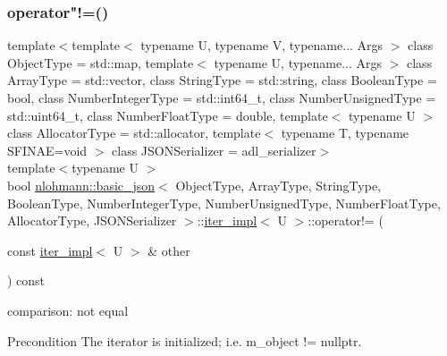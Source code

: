 \subsubsection{\texorpdfstring{operator"!=()}{operator!=()}}
{\footnotesize\ttfamily template$<$template$<$ typename U, typename V, typename... Args $>$ class Object\+Type = std\+::map, template$<$ typename U, typename... Args $>$ class Array\+Type = std\+::vector, class String\+Type  = std\+::string, class Boolean\+Type  = bool, class Number\+Integer\+Type  = std\+::int64\+\_\+t, class Number\+Unsigned\+Type  = std\+::uint64\+\_\+t, class Number\+Float\+Type  = double, template$<$ typename U $>$ class Allocator\+Type = std\+::allocator, template$<$ typename T, typename S\+F\+I\+N\+A\+E=void $>$ class J\+S\+O\+N\+Serializer = adl\+\_\+serializer$>$ \\
template$<$typename U $>$ \\
bool \hyperlink{classnlohmann_1_1basic__json}{nlohmann\+::basic\+\_\+json}$<$ Object\+Type, Array\+Type, String\+Type, Boolean\+Type, Number\+Integer\+Type, Number\+Unsigned\+Type, Number\+Float\+Type, Allocator\+Type, J\+S\+O\+N\+Serializer $>$\+::\hyperlink{classnlohmann_1_1basic__json_1_1iter__impl}{iter\+\_\+impl}$<$ U $>$\+::operator!= (\begin{DoxyParamCaption}\item[{const \hyperlink{classnlohmann_1_1basic__json_1_1iter__impl}{iter\+\_\+impl}$<$ U $>$ \&}]{other }\end{DoxyParamCaption}) const\hspace{0.3cm}{\ttfamily [inline]}}



comparison\+: not equal 

\begin{DoxyPrecond}{Precondition}
The iterator is initialized; i.\+e. {\ttfamily m\+\_\+object != nullptr}. 
\end{DoxyPrecond}
\mbox{\label{classnlohmann_1_1basic__json_1_1iter__impl_ae0a628811b09b9adea6d68c3a5c4ca2a}} 
